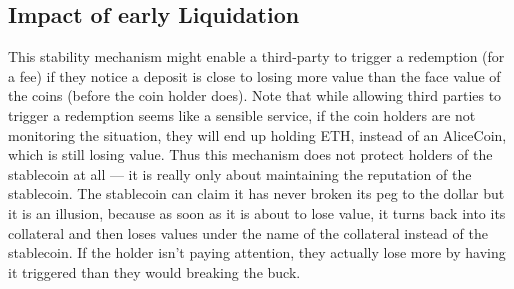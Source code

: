 \subsection{Impact of early Liquidation}
This stability mechanism might enable a third-party to trigger a redemption (for a fee) if they notice a deposit is close to losing more value than the face value of the coins (before the coin holder does). Note that while allowing third parties to trigger a redemption seems like a sensible service, if the coin holders are not monitoring the situation, they will end up holding ETH, instead of an AliceCoin, which is still losing value. Thus this mechanism does not protect holders of the stablecoin at all --- it is really only about maintaining the reputation of the stablecoin. The stablecoin can claim it has never broken its peg to the dollar but it is an illusion, because as soon as it is about to lose value, it turns back into its collateral and then loses values under the name of the collateral instead of the stablecoin. If the holder isn’t paying attention, they actually lose more by having it triggered than they would breaking the buck.